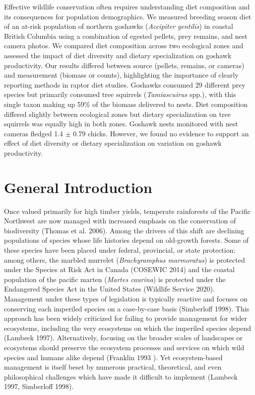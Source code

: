 \documentclass{sfuthesis}
\begin{document}
Effective wildlife conservation often requires understanding diet composition and its consequences for population demographics. We measured breeding season diet of an at-risk population of northern goshawks (\emph{Accipiter gentilis}) in coastal British Columbia using a combination of egested pellets, prey remains, and nest camera photos. We compared diet composition across two ecological zones and assessed the impact of diet diversity and dietary specialization on goshawk productivity. Our results differed between source (pellets, remains, or cameras) and measurement (biomass or counts), highlighting the importance of clearly reporting methods in raptor diet studies. Goshawks consumed 29 different prey species but primarily consumed tree squirrels (\emph{Tamiascuirus} spp.), with this single taxon making up 59\% of the biomass delivered to nests. Diet composition differed slightly between ecological zones but dietary specialization on tree squirrels was equally high in both zones. Goshawk nests monitored with nest cameras fledged 1.4 \(\pm\) 0.79 chicks. However, we found no evidence to support an effect of diet diversity or dietary specialization on variation on goshawk productivity.

\hypertarget{general-introduction}{%
\section{General Introduction}\label{general-introduction}}

Once valued primarily for high timber yields, temperate rainforests of the Pacific Northwest are now managed with increased emphasis on the conservation of biodiversity (Thomas et al. 2006). Among the drivers of this shift are declining populations of species whose life histories depend on old-growth forests. Some of these species have been placed under federal, provincial, or state protection: among others, the marbled murrelet (\emph{Brachyramphus marmoratus}) is protected under the Species at Risk Act in Canada (COSEWIC 2014) and the coastal population of the pacific marten (\emph{Martes caurina}) is protected under the Endangered Species Act in the United States (Wildlife Service 2020). Management under these types of legislation is typically reactive and focuses on conserving each imperiled species on a case-by-case basis (Simberloff 1998). This approach has been widely criticized for failing to provide management for wider ecosystems, including the very ecosystems on which the imperiled species depend (Lambeck 1997). Alternatively, focusing on the broader scales of landscapes or ecosystems should preserve the ecosystem processes and services on which wild species and humans alike depend (Franklin 1993 ). Yet ecosystem-based management is itself beset by numerous practical, theoretical, and even philosophical challenges which have made it difficult to implement (Lambeck 1997, Simberloff 1998).
\end{document}
